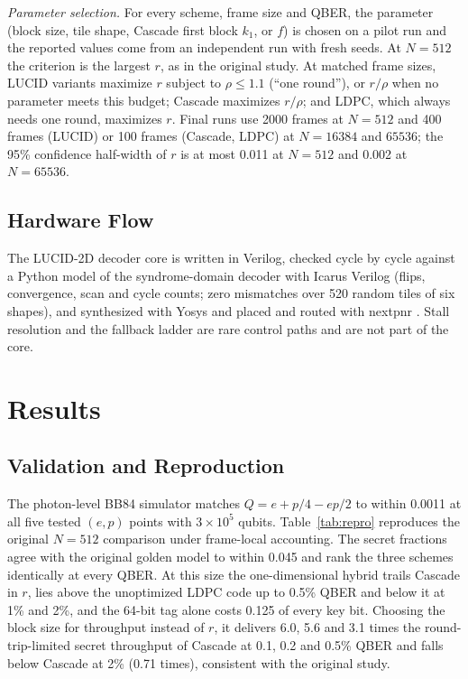 \documentclass[conference]{IEEEtran}
\begin{document}
\textit{Parameter selection.} For every scheme, frame size and QBER, the parameter (block size, tile shape, Cascade first block $k_1$, or $f$) is chosen on a pilot run and the reported values come from an independent run with fresh seeds. At $N=512$ the criterion is the largest $r$, as in the original study. At matched frame sizes, LUCID variants maximize $r$ subject to $\rho\le1.1$ (``one round''), or $r/\rho$ when no parameter meets this budget; Cascade maximizes $r/\rho$; and LDPC, which always needs one round, maximizes $r$. Final runs use 2000 frames at $N=512$ and 400 frames (LUCID) or 100 frames (Cascade, LDPC) at $N=16384$ and $65536$; the 95\% confidence half-width of $r$ is at most 0.011 at $N=512$ and 0.002 at $N=65536$.

\subsection{Hardware Flow}
The LUCID-2D decoder core is written in Verilog, checked cycle by cycle against a Python model of the syndrome-domain decoder with Icarus Verilog \cite{icarus} (flips, convergence, scan and cycle counts; zero mismatches over 520 random tiles of six shapes), and synthesized with Yosys and placed and routed with nextpnr \cite{shah2019}. Stall resolution and the fallback ladder are rare control paths and are not part of the core.

\section{Results}\label{sec:results}

\subsection{Validation and Reproduction}
The photon-level BB84 simulator matches $Q=e+p/4-ep/2$ to within 0.0011 at all five tested $(e,p)$ points with $3\times10^{5}$ qubits. Table~\ref{tab:repro} reproduces the original $N=512$ comparison under frame-local accounting. The secret fractions agree with the original golden model to within 0.045 and rank the three schemes identically at every QBER. At this size the one-dimensional hybrid trails Cascade in $r$, lies above the unoptimized LDPC code up to 0.5\% QBER and below it at 1\% and 2\%, and the 64-bit tag alone costs 0.125 of every key bit. Choosing the block size for throughput instead of $r$, it delivers 6.0, 5.6 and 3.1 times the round-trip-limited secret throughput of Cascade at 0.1, 0.2 and 0.5\% QBER and falls below Cascade at 2\% (0.71 times), consistent with the original study.
\end{document}
